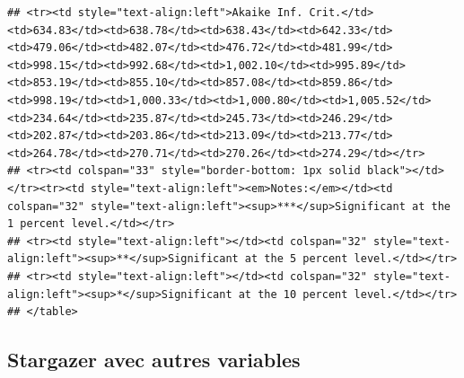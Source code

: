 \documentclass[
]{article}
\begin{document}
\begin{verbatim}
## <tr><td style="text-align:left">Akaike Inf. Crit.</td><td>634.83</td><td>638.78</td><td>638.43</td><td>642.33</td><td>479.06</td><td>482.07</td><td>476.72</td><td>481.99</td><td>998.15</td><td>992.68</td><td>1,002.10</td><td>995.89</td><td>853.19</td><td>855.10</td><td>857.08</td><td>859.86</td><td>998.19</td><td>1,000.33</td><td>1,000.80</td><td>1,005.52</td><td>234.64</td><td>235.87</td><td>245.73</td><td>246.29</td><td>202.87</td><td>203.86</td><td>213.09</td><td>213.77</td><td>264.78</td><td>270.71</td><td>270.26</td><td>274.29</td></tr>
## <tr><td colspan="33" style="border-bottom: 1px solid black"></td></tr><tr><td style="text-align:left"><em>Notes:</em></td><td colspan="32" style="text-align:left"><sup>***</sup>Significant at the 1 percent level.</td></tr>
## <tr><td style="text-align:left"></td><td colspan="32" style="text-align:left"><sup>**</sup>Significant at the 5 percent level.</td></tr>
## <tr><td style="text-align:left"></td><td colspan="32" style="text-align:left"><sup>*</sup>Significant at the 10 percent level.</td></tr>
## </table>
\end{verbatim}

\hypertarget{stargazer-avec-autres-variables}{%
\subsection{Stargazer avec autres
variables}\label{stargazer-avec-autres-variables}}
\end{document}
